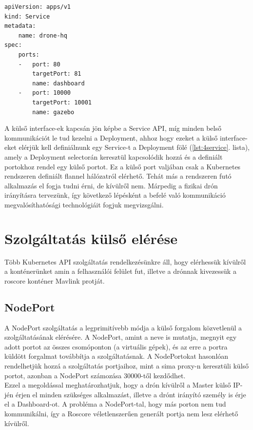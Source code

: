 \begin{minipage}{\linewidth}
\begin{lstlisting}[caption={Példa 4 konténeres megoldás service kivezetésére},label={lst:4service}]
apiVersion: apps/v1
kind: Service
metadata:
	name: drone-hq
spec:
	ports:
	-	port: 80
		targetPort: 81
		name: dashboard
	-	port: 10000
		targetPort: 10001
		name: gazebo
\end{lstlisting}
\end{minipage}

\noindent
A külső interface-ek kapcsán jön képbe a Service API, míg minden belső kommunikációt le tud kezelni a Deployment, ahhoz hogy ezeket a külső interface-eket elérjük kell definiálnunk egy Service-t a Deployment fölé (\ref{lst:4service}. lista), amely a Deployment selectorán keresztül kapcsolódik hozzá és a definiált portokhoz rendel egy külső portot. Ez a külső port valjában csak a Kubernetes rendszeren definiált flannel hálózatról elérhető. Tehát más a rendszeren futó alkalmazás el fogja tudni érni, de kívülről nem. Márpedig a fizikai drón irányításra tervezünk, így következő lépésként a befelé való kommunikáció megvalósíthatósági technológiáit fogjuk megvizsgálni.

\section{Szolgáltatás külső elérése}
Több Kubernetes API szolgáltatás rendelkezésünkre áll, hogy elérhessük kívülről a konténerünket amin a felhasználói felület fut, illetve a drónnak kivezessük a roscore konténer Mavlink protját.

\subsection{NodePort}
A NodePort szolgáltatás a legprimitívebb módja a külső forgalom közvetlenül a szolgáltatásának elérésére. A NodePort, amint a neve is mutatja, megnyit egy adott portot az összes csomóponton (a virtuális gépek), és az erre a portra küldött forgalmat továbbítja a szolgáltatásnak. \cite{nodeport} A NodePortokat hasonlóan rendelhetjük hozzá a szolgáltatás portjaihoz, mint a sima proxy-n keresztüli külső portot, azonban a NodePort számozása 30000-től kezdődhet. \\

\noindent
Ezzel a megoldással meghatározhatjuk, hogy a drón kívülről a Master külső IP-jén érjen el minden szükséges alkalmazást, illetve a drónt irányító személy is érje el a Dashboard-ot. A probléma a NodePort-tal, hogy más porton nem tud kommunikálni, így a Roscore véletlenszerűen generált portja nem lesz elérhető kívülről.

